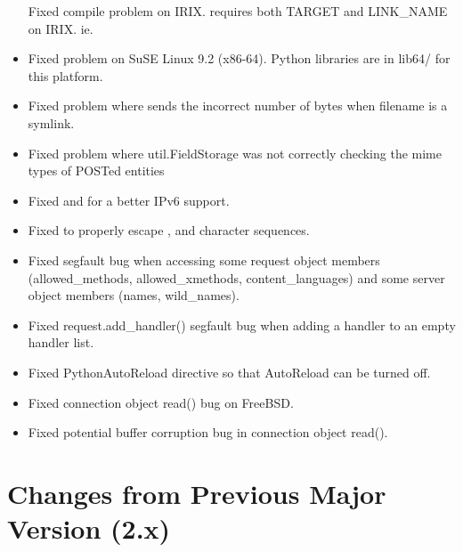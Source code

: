 \begin{itemize}
      Fixed compile problem on IRIX.  requires both TARGET and LINK_NAME
      on IRIX. ie. 
    \item
      Fixed  problem on SuSE Linux 9.2 (x86-64). Python libraries
      are in lib64/ for this platform.
    \item
      Fixed  problem where  sends the incorrect
      number of bytes when filename is a symlink. 
    \item
      Fixed problem where util.FieldStorage was not correctly checking the mime
      types of POSTed entities
    \item
      Fixed  and  for a better IPv6 support. 
    \item
      Fixed  to properly escape , 
      and  character sequences. 
    \item
      Fixed segfault bug when accessing some request object members 
      (allowed_methods, allowed_xmethods, content_languages) and some server
      object members (names, wild_names).
    \item
      Fixed request.add_handler() segfault bug when adding a handler to an empty
      handler list.
    \item
      Fixed PythonAutoReload directive so that AutoReload can be turned off.
    \item
      Fixed connection object read() bug on FreeBSD.
    \item
      Fixed potential buffer corruption bug in connection object read().
\end{itemize}

\chapter{Changes from Previous Major Version (2.x)\label{app-changes-from-2.x}}


